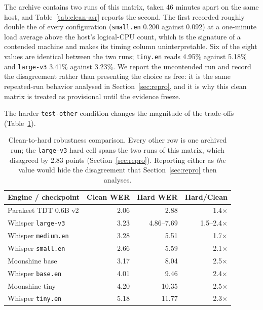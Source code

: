 The archive contains two runs of this matrix, taken 46 minutes apart on the same host, and
Table~\ref{tab:clean-asr} reports the second. The first recorded roughly double the \rtf{} of
every configuration (\texttt{small.en} 0.200 against 0.092) at a one-minute load average above
the host's logical-CPU count, which is the signature of a contended machine and makes its timing
column uninterpretable. Six of the eight \wer{} values are identical between the two runs;
\texttt{tiny.en} reads 4.95\% against 5.18\% and \texttt{large-v3} 3.41\% against 3.23\%. We
report the uncontended run and record the disagreement rather than presenting the choice as
free: it is the same repeated-run behavior analysed in Section~\ref{sec:repro}, and it is why
this clean matrix is treated as provisional until the evidence freeze.

The harder \texttt{test-other} condition changes the magnitude of the trade-offs
(Table~\ref{tab:hard-asr}).

\begin{table}[ht]
\centering
\caption{Clean-to-hard robustness comparison. Every other row is one archived run; the
\texttt{large-v3} hard cell spans the two runs of this matrix, which disagreed by 2.83
\wer{} points (Section~\ref{sec:repro}). Reporting either as \emph{the} value would hide the
disagreement that Section~\ref{sec:repro} then analyses.}
\label{tab:hard-asr}
\begin{tabular}{lrrr}
\toprule
Engine / checkpoint & Clean WER & Hard WER & Hard/Clean \\
\midrule
Parakeet TDT 0.6B v2 & 2.06 & 2.88 & 1.4$\times$ \\
Whisper \texttt{large-v3} & 3.23 & 4.86--7.69 & 1.5--2.4$\times$ \\
Whisper \texttt{medium.en} & 3.28 & 5.51 & 1.7$\times$ \\
Whisper \texttt{small.en} & 2.66 & 5.59 & 2.1$\times$ \\
Moonshine base & 3.17 & 8.04 & 2.5$\times$ \\
Whisper \texttt{base.en} & 4.01 & 9.46 & 2.4$\times$ \\
Moonshine tiny & 4.20 & 10.35 & 2.5$\times$ \\
Whisper \texttt{tiny.en} & 5.18 & 11.77 & 2.3$\times$ \\
\bottomrule
\end{tabular}
\end{table}

